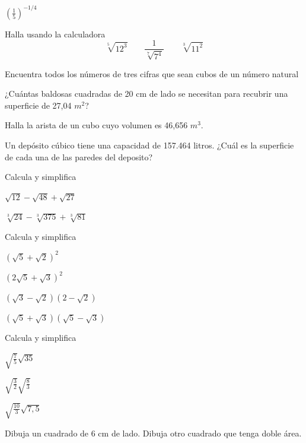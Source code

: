 \documentclass[letterpaper,10pt,twoside]{article}
\begin{document}
\begin{enumerate}
\begin{multicols}{2}
\begin{enumerate}
\begin{multicols}{2}
    \item $ \left(\frac{1}{5}\right)^{-1/4} $
  \end{multicols}
  \end{enumerate}
  \item Halla usando la calculadora
  \[ \sqrt[5]{12^3}\qquad \dfrac{1}{\sqrt[7]{7^4}}\qquad \sqrt[3]{11^2} \]
  \item Encuentra todos los números de tres cifras que sean cubos de un número natural
  \item ¿Cuántas baldosas cuadradas de 20 cm de lado se necesitan para recubrir una superficie de 27,04 $ m^2 $?
  \item Halla la arista de un cubo cuyo volumen es 46,656 $m^3$.
  \item Un depósito cúbico tiene una capacidad de 157.464 litros. ¿Cuál es la superficie de cada una de las paredes del deposito?
\item Calcula y simplifica
\begin{enumerate}\begin{multicols}{2}
  \item $ \sqrt{12}-\sqrt{48}+\sqrt{27} $  
  \item $ \sqrt[3]{24}-\sqrt[3]{375}+\sqrt[3]{81} $
\end{multicols}
\end{enumerate}
\item Calcula y simplifica
\begin{enumerate}\begin{multicols}{2}
  \item $ (\sqrt{5}+\sqrt{2})^2 $  \item $ (2\sqrt{5}+\sqrt{3})^2 $ \item $ (\sqrt{3}-\sqrt{2})(2-\sqrt{2}) $ \item $ (\sqrt{5}+\sqrt{3})(\sqrt{5}-\sqrt{3}) $
\end{multicols}
\end{enumerate}
\item Calcula y simplifica
\begin{enumerate}\begin{multicols}{3}
  \item  $ \sqrt{\frac{7}{5}}\sqrt{35} $
  \item $ \sqrt{\frac{3}{2}}\sqrt{\frac{8}{3}} $
  \item $ \sqrt{\frac{10}{3}}\sqrt{7,5}$
\end{multicols}
\end{enumerate}
\item Dibuja un cuadrado de 6 cm de lado. Dibuja otro cuadrado que tenga doble área.

\end{multicols}
\end{enumerate}
\end{document}
